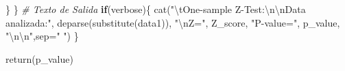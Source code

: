 \documentclass[]{article}
\newenvironment{Shaded}{\begin{snugshade}}{\end{snugshade}}
\newcommand{\AttributeTok}[1]{\textcolor[rgb]{0.77,0.63,0.00}{#1}}
\newcommand{\CommentTok}[1]{\textcolor[rgb]{0.56,0.35,0.01}{\textit{#1}}}
\newcommand{\ControlFlowTok}[1]{\textcolor[rgb]{0.13,0.29,0.53}{\textbf{#1}}}
\newcommand{\FunctionTok}[1]{\textcolor[rgb]{0.00,0.00,0.00}{#1}}
\newcommand{\NormalTok}[1]{#1}
\newcommand{\SpecialCharTok}[1]{\textcolor[rgb]{0.00,0.00,0.00}{#1}}
\newcommand{\StringTok}[1]{\textcolor[rgb]{0.31,0.60,0.02}{#1}}
\begin{document}
\begin{Shaded}
\begin{Highlighting}[]
\NormalTok{      \}}
\NormalTok{    \}}
    \CommentTok{\# Texto de Salida}
    \ControlFlowTok{if}\NormalTok{(verbose)\{}
      \FunctionTok{cat}\NormalTok{(}\StringTok{"}\SpecialCharTok{\textbackslash{}t}\StringTok{One{-}sample Z{-}Test:}\SpecialCharTok{\textbackslash{}n\textbackslash{}n}\StringTok{Data analizada:"}\NormalTok{,}
                      \FunctionTok{deparse}\NormalTok{(}\FunctionTok{substitute}\NormalTok{(data1)), }\StringTok{"}\SpecialCharTok{\textbackslash{}n}\StringTok{Z="}\NormalTok{, Z\_score, }
                      \StringTok{"P{-}value="}\NormalTok{, p\_value, }\StringTok{"}\SpecialCharTok{\textbackslash{}n\textbackslash{}n}\StringTok{"}\NormalTok{,}\AttributeTok{sep=}\StringTok{" "}\NormalTok{)}
\NormalTok{    \}}
    
    \FunctionTok{return}\NormalTok{(p\_value)}
    

\end{Highlighting}
\end{Shaded}
\end{document}
